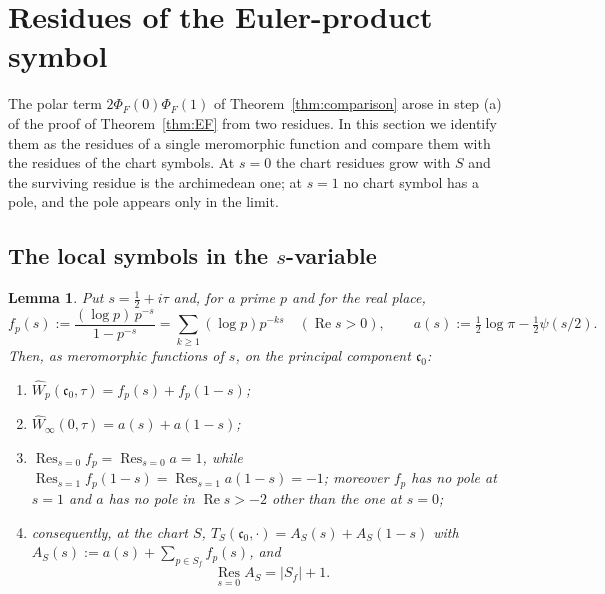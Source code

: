 \documentclass[11pt]{amsart}
\newtheorem{lemma}[theorem]{Lemma}
\theoremstyle{definition}
\theoremstyle{remark}
\newcommand{\Rel}{\operatorname{Re}}
\newcommand{\Res}{\operatorname*{Res}}
\newcommand{\cz}{\mathfrak c_0}
\begin{document}
\section{Residues of the Euler-product symbol}
\label{sec:polar}

The polar term $2\Phi_F(0)\Phi_F(1)$ of Theorem~\ref{thm:comparison} arose in
step (a) of the proof of Theorem~\ref{thm:EF} from two residues.  In this
section we identify them as the residues of a single meromorphic function and
compare them with the residues of the chart symbols.  At $s=0$ the chart
residues grow with $S$ and the surviving residue is the archimedean one; at
$s=1$ no chart symbol has a pole, and the pole appears only in the limit.

\subsection{The local symbols in the \texorpdfstring{$s$}{s}-variable}

\begin{lemma}
\label{lem:localsymbols}
Put $s=\tfrac12+i\tau$ and, for a prime $p$ and for the real place,
\begin{equation}
  f_p(s):=\frac{(\log p)\,p^{-s}}{1-p^{-s}}=\sum_{k\ge1}(\log p)p^{-ks}
  \quad(\Rel s>0),\qquad
  a(s):=\tfrac12\log\pi-\tfrac12\psi(s/2).
\tag{10.1}
\end{equation}
Then, as meromorphic functions of $s$, on the principal component $\cz$:
\begin{enumerate}
\item[(i)] $\widehat W_p(\cz,\tau)=f_p(s)+f_p(1-s)$;
\item[(ii)] $\widehat W_\infty(0,\tau)=a(s)+a(1-s)$;
\item[(iii)] $\Res_{s=0}f_p=\Res_{s=0}a=1$, while
$\Res_{s=1}f_p(1-s)=\Res_{s=1}a(1-s)=-1$; moreover $f_p$ has no pole at $s=1$
and $a$ has no pole in $\Rel s>-2$ other than the one at $s=0$;
\item[(iv)] consequently, at the chart $S$,
$\widehat T_S(\cz,\cdot)=A_S(s)+A_S(1-s)$ with
$A_S(s):=a(s)+\sum_{p\in S_f}f_p(s)$, and
\[
  \Res_{s=0}A_S=|S_f|+1 .
\]
\end{enumerate}
\end{lemma}
\end{document}
